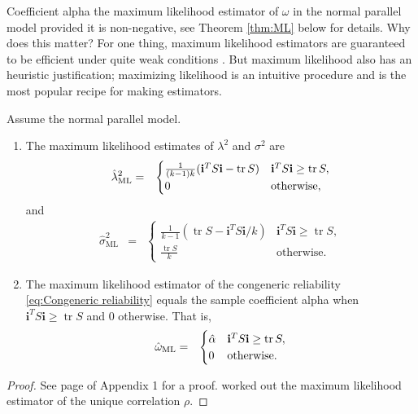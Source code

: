 \documentclass[twoside]{article}
\DeclareMathOperator{\tr}{tr}
\begin{document}
Coefficient alpha the maximum likelihood estimator of $\omega$ in the normal parallel model provided it is non-negative, see Theorem \ref{thm:ML} below for details. Why does this matter? For one thing, maximum likelihood estimators are guaranteed to be efficient under quite weak conditions \citep[][Section 7.3]{Lehmann2004-ke}. But maximum likelihood also has an heuristic justification; maximizing likelihood is an intuitive procedure and is the most popular recipe for making estimators.

\begin{thm}\label{thm:ML}
Assume the normal parallel model.
\begin{enumerate}[label=(\roman*)]
\item The maximum likelihood estimates of $\lambda^{2}$
and $\sigma^{2}$ are 
\begin{eqnarray*}
\hat{\lambda}^2_\textrm{ML} & = & \begin{cases}
\frac{1}{(k-1)k}(\mathbf{i}^{T}S\mathbf{i}-\tr{S}) & \mathbf{i}^{T}S\mathbf{i}\geq\tr{S},\\
0 & \text{\textrm{otherwise}},
\end{cases}\\
\end{eqnarray*}
and
\begin{eqnarray*}
\hat{\sigma}^2_\textrm{ML} & = & \begin{cases}
\frac{1}{k-1}(\tr{S}-\mathbf{i}^{T}S\mathbf{i}/k) & \mathbf{i}^{T}S\mathbf{i}\geq\tr{S},\\
\frac{\tr{S}}{k} & \textrm{otherwise}.
\end{cases}
\end{eqnarray*}
\item The maximum likelihood estimator of the congeneric reliability
\eqref{eq:Congeneric reliability} equals the sample coefficient alpha
when $\mathbf{i}^{T}S\mathbf{i}\geq\tr{S}$ and $0$ otherwise. That is,
\begin{eqnarray*}
\hat{\omega}_\textrm{ML} & = & \begin{cases}
\hat{\alpha} & \mathbf{i}^{T}S\mathbf{i}\geq\tr{S},\\
0 & \text{\textrm{otherwise}}.
\end{cases}
\end{eqnarray*}
\end{enumerate}
\end{thm}
\begin{proof}
See page \pageref{proof:ML} of Appendix 1 for a proof. \citet[][section B]{Kristof1963-tb} worked out the maximum likelihood estimator of the unique correlation $\rho$. 
\end{proof}
\end{document}

